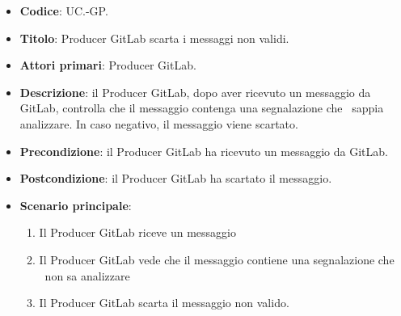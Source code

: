 			\begin{itemize}
				\item \textbf{Codice}: UC\theuccount.\thesubuccount-GP.
				\item \textbf{Titolo}: Producer GitLab scarta i messaggi non validi.
				\item \textbf{Attori primari}: Producer GitLab.
				\item \textbf{Descrizione}: il Producer GitLab, dopo aver ricevuto un messaggio da GitLab, controlla
                che il messaggio contenga una segnalazione che \progetto\ sappia analizzare. In caso negativo, il messaggio viene scartato.
                \item \textbf{Precondizione}: il Producer GitLab ha ricevuto un messaggio da GitLab.
                \item \textbf{Postcondizione}: il Producer GitLab ha scartato il messaggio.
                \item \textbf{Scenario principale}:
                \begin{enumerate}
                    \item Il Producer GitLab riceve un messaggio
                    \item Il Producer GitLab vede che il messaggio contiene una segnalazione che \progetto\ non sa analizzare
                    \item Il Producer GitLab scarta il messaggio non valido.
                \end{enumerate}
            \end{itemize}
